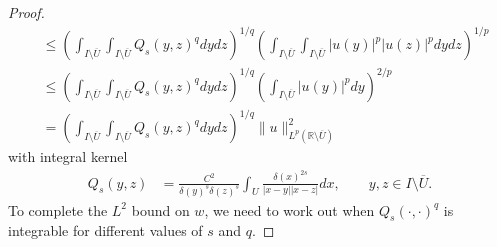 \documentclass[preprint,12pt]{elsarticle}
\newcommand{\R}{\mathbb R}
\begin{document}
\begin{proof}
\begin{align}
        &\leq\left(\int_{I\setminus\overline{U}}\int_{I\setminus\overline{U}}Q_s(y,z)^qdydz\right)^{1/q}\left(\int_{I\setminus\overline{U}}\int_{I\setminus\overline{U}}|u(y)|^p|u(z)|^pdydz\right)^{1/p}\nonumber\\
        &\leq\left(\int_{I\setminus\overline{U}}\int_{I\setminus\overline{U}}Q_s(y,z)^qdydz\right)^{1/q}\left(\int_{I\setminus\overline{U}}|u(y)|^pdy\right)^{2/p}\nonumber\nonumber\\
        &=\left(\int_{I\setminus\overline{U}}\int_{I\setminus\overline{U}}Q_s(y,z)^qdydz\right)^{1/q}\|u\|^2_{L^p(\R\setminus\overline{U})}
    \end{align}
    with integral kernel 
    \begin{align}\label{kernal_Qs}
        Q_s(y,z)&=\frac{C^2}{\delta(y)^s\delta(z)^s}\int_{U}\frac{\delta(x)^{2s}}{|x-y||x-z|}dx, \qquad y,z\in I\setminus\overline{U}.
    \end{align}    
    To complete the $L^2$ bound on $w$, we need to work out when $Q_s(\cdot,\cdot)^q$ is integrable for different values of $s$ and $q$.
    

\end{proof}
\end{document}
